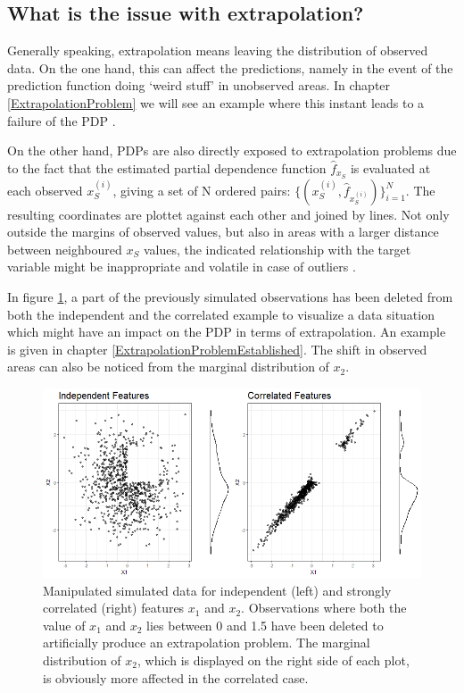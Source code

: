 \documentclass[]{krantz}
\begin{document}
\subsection{What is the issue with
extrapolation?}\label{what-is-the-issue-with-extrapolation}

Generally speaking, extrapolation means leaving the distribution of
observed data. On the one hand, this can affect the predictions, namely
in the event of the prediction function doing `weird stuff' in
unobserved areas. In chapter \ref{ExtrapolationProblem} we will see an
example where this instant leads to a failure of the PDP
\citep{molnar2019}.

On the other hand, PDPs are also directly exposed to extrapolation
problems due to the fact that the estimated partial dependence function
\(\hat{f}_{x_S}\) is evaluated at each observed \(x^{(i)}_{S}\), giving
a set of N ordered pairs:
\(\{(x^{(i)}_{S}, \hat{f}_{x^{(i)}_{S}})\}_{i=1}^N\). The resulting
coordinates are plottet against each other and joined by lines. Not only
outside the margins of observed values, but also in areas with a larger
distance between neighboured \(x_S\) values, the indicated relationship
with the target variable might be inappropriate and volatile in case of
outliers \citep{Goldstein2013}.

In figure \ref{fig:Figure02}, a part of the previously simulated
observations has been deleted from both the independent and the
correlated example to visualize a data situation which might have an
impact on the PDP in terms of extrapolation. An example is given in
chapter \ref{ExtrapolationProblemEstablished}. The shift in observed
areas can also be noticed from the marginal distribution of \(x_2\).

\begin{figure}
\includegraphics[width=1\linewidth]{images/VK_PDP_2_Data_ind_dep_gap} \caption{Manipulated simulated data for independent (left) and strongly correlated (right) features $x_1$ and $x_2$. Observations where both the value of $x_1$ and $x_2$ lies between 0 and 1.5 have been deleted to artificially produce an extrapolation problem. The marginal distribution of $x_2$, which is displayed on the right side of each plot, is obviously more affected in the correlated case.}\label{fig:Figure02}
\end{figure}
\end{document}
